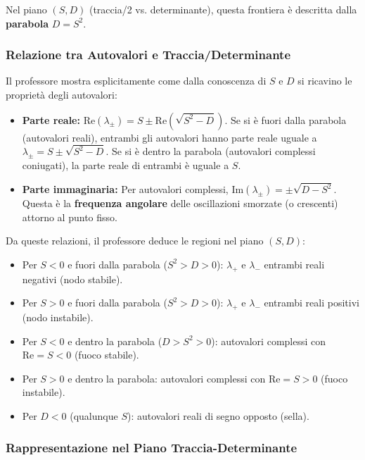 Nel piano $(S, D)$ (traccia/2 vs. determinante), questa frontiera è descritta dalla \textbf{parabola} $D = S^2$.

\subsubsection{Relazione tra Autovalori e Traccia/Determinante}

Il professore mostra esplicitamente come dalla conoscenza di $S$ e $D$ si ricavino le proprietà degli autovalori:

\begin{itemize}
    \item \textbf{Parte reale:} $\text{Re}(\lambda_\pm) = S \pm \text{Re}\!\left(\sqrt{S^2 - D}\right)$. Se si è fuori dalla parabola (autovalori reali), entrambi gli autovalori hanno parte reale uguale a $\lambda_\pm = S \pm \sqrt{S^2 - D}$. Se si è dentro la parabola (autovalori complessi coniugati), la parte reale di entrambi è uguale a $S$.
    \item \textbf{Parte immaginaria:} Per autovalori complessi, $\text{Im}(\lambda_\pm) = \pm\sqrt{D - S^2}$. Questa è la \textbf{frequenza angolare} delle oscillazioni smorzate (o crescenti) attorno al punto fisso.
\end{itemize}

Da queste relazioni, il professore deduce le regioni nel piano $(S, D)$:
\begin{itemize}
    \item Per $S < 0$ e fuori dalla parabola ($S^2 > D > 0$): $\lambda_+$ e $\lambda_-$ entrambi reali negativi (nodo stabile).
    \item Per $S > 0$ e fuori dalla parabola ($S^2 > D > 0$): $\lambda_+$ e $\lambda_-$ entrambi reali positivi (nodo instabile).
    \item Per $S < 0$ e dentro la parabola ($D > S^2 > 0$): autovalori complessi con $\text{Re} = S < 0$ (fuoco stabile).
    \item Per $S > 0$ e dentro la parabola: autovalori complessi con $\text{Re} = S > 0$ (fuoco instabile).
    \item Per $D < 0$ (qualunque $S$): autovalori reali di segno opposto (sella).
\end{itemize}

\subsubsection{Rappresentazione nel Piano Traccia-Determinante}

